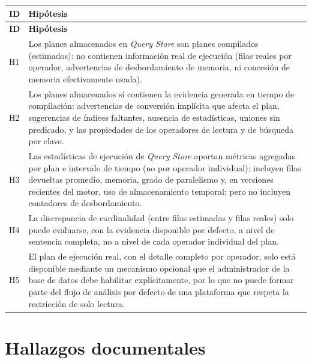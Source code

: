 \documentclass[11pt,a4paper]{report}
\begin{document}
\begin{xltabular}{\linewidth}{@{}p{1.1cm}X@{}}
\toprule
\textbf{ID} & \textbf{Hip\'otesis} \\
\midrule
\endfirsthead
\toprule
\textbf{ID} & \textbf{Hip\'otesis} \\
\midrule
\endhead
\bottomrule
\endlastfoot
H1 & Los planes almacenados en \textit{Query Store} son planes compilados (estimados): no contienen informaci\'on real de ejecuci\'on (filas reales por operador, advertencias de desbordamiento de memoria, ni concesi\'on de memoria efectivamente usada). \\
H2 & Los planes almacenados s\'i contienen la evidencia generada en tiempo de compilaci\'on: advertencias de conversi\'on impl\'icita que afecta el plan, sugerencias de \'indices faltantes, ausencia de estad\'isticas, uniones sin predicado, y las propiedades de los operadores de lectura y de b\'usqueda por clave. \\
H3 & Las estad\'isticas de ejecuci\'on de \textit{Query Store} aportan m\'etricas agregadas por plan e intervalo de tiempo (no por operador individual): incluyen filas devueltas promedio, memoria, grado de paralelismo y, en versiones recientes del motor, uso de almacenamiento temporal; pero no incluyen contadores de desbordamiento. \\
H4 & La discrepancia de cardinalidad (entre filas estimadas y filas reales) solo puede evaluarse, con la evidencia disponible por defecto, a nivel de sentencia completa, no a nivel de cada operador individual del plan. \\
H5 & El plan de ejecuci\'on real, con el detalle completo por operador, solo est\'a disponible mediante un mecanismo opcional que el administrador de la base de datos debe habilitar expl\'icitamente, por lo que no puede formar parte del flujo de an\'alisis por defecto de una plataforma que respeta la restricci\'on de solo lectura. \\
\end{xltabular}

\section{Hallazgos documentales}
\end{document}
